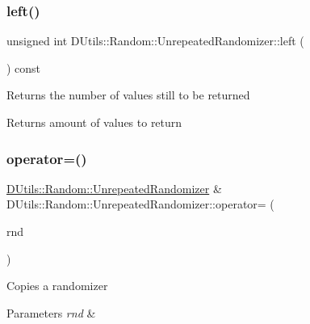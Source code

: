\subsubsection{\texorpdfstring{left()}{left()}}
{\footnotesize\ttfamily unsigned int D\+Utils\+::\+Random\+::\+Unrepeated\+Randomizer\+::left (\begin{DoxyParamCaption}{ }\end{DoxyParamCaption}) const\hspace{0.3cm}{\ttfamily [inline]}}

Returns the number of values still to be returned \begin{DoxyReturn}{Returns}
amount of values to return 
\end{DoxyReturn}
\mbox{\label{class_d_utils_1_1_random_1_1_unrepeated_randomizer_a18f74b44fe6747fa3498bdbe6422648e}} 
\subsubsection{\texorpdfstring{operator=()}{operator=()}}
{\footnotesize\ttfamily \mbox{\hyperlink{class_d_utils_1_1_random_1_1_unrepeated_randomizer}{D\+Utils\+::\+Random\+::\+Unrepeated\+Randomizer}} \& D\+Utils\+::\+Random\+::\+Unrepeated\+Randomizer\+::operator= (\begin{DoxyParamCaption}\item[{const \mbox{\hyperlink{class_d_utils_1_1_random_1_1_unrepeated_randomizer}{Unrepeated\+Randomizer}} \&}]{rnd }\end{DoxyParamCaption})}

Copies a randomizer 
\begin{DoxyParams}{Parameters}
{\em rnd} & \\
\hline
\end{DoxyParams}
\mbox{\label{class_d_utils_1_1_random_1_1_unrepeated_randomizer_a315e00744de8bb3794d154797d02ec1f}} 
